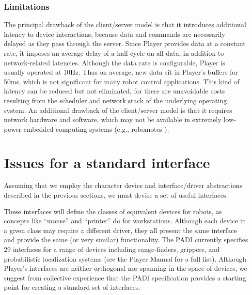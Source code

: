 \documentclass[letterpaper, 10 pt, conference]{iros03}
\begin{document}
\subsubsection{Limitations}
The principal drawback of the client/server model is that it
introduces additional latency to device interactions, because data and
commands are necessarily delayed as they pass through the server.
Since Player provides data at a constant rate, it imposes an average
delay of a half cycle on all data, in addition to network-related
latencies.  Although the data rate is configurable, Player is usually
operated at 10Hz.  Thus on average, new data sit in Player's buffers
for 50ms, which is not significant for many robot control
applications.  This kind of latency can be reduced but not eliminated,
for there are unavoidable costs resulting from the scheduler and
network stack of the underlying operating system.  An additional
drawback of the client/server model is that it requires network
hardware and software, which may not be available in extremely
low-power embedded computing systems (e.g., robomotes
\cite{SibleyRahimiSukhatme02}).

\section{Issues for a standard interface}
% 



Assuming that we employ the character device and interface/driver
abstractions described in the previous sections, we must devise a set
of useful interfaces.

These interfaces will define the classes of equivalent devices for
robots, as concepts like ``mouse'' and ``printer'' do for
workstations.  Although each device in a given class may require a
different driver, they all present the same interface and provide the
same (or very similar) functionality.  The PADI currently specifies 29
interfaces for a range of devices including range-finders, grippers,
and probabilistic localization systems (see the Player
Manual \cite{playermanual} for a full list).  Although Player's
interfaces are neither orthogonal nor spanning in the space of
devices, we suggest from collective experience that the PADI
specification provides a starting point for creating a standard set of
interfaces.
\end{document}
